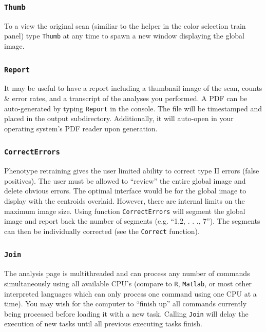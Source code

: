 \documentclass[12pt]{article}
\begin{document}
\subsubsection{\tt Thumb}

To a view the original scan (similiar to the helper in the color {\sf selection train} panel) type {\tt Thumb} at any time to spawn a new window displaying the global image.

\subsubsection{\tt Report}

It may be useful to have a report including a thumbnail image of the scan, counts \& error rates, and a transcript of the analyses you performed. A PDF can be auto-generated by typing {\tt Report} in the console. The file will be timestamped and placed in the output subdirectory. Additionally, it will auto-open in your operating system's PDF reader upon generation.

\subsubsection{\tt CorrectErrors}

Phenotype retraining gives the user limited ability to correct type II errors (false positives). The user must be allowed to ``review'' the entire global image and delete obvious errors. The optimal interface would be for the global image to display with the centroids overlaid. However, there are internal limits on the maximum image size. Using function {\tt CorrectErrors} will segment the global image and report back the number of segments (e.g. ``1,2, . . ., 7''). The segments can then be individually corrected (see the {\tt Correct} function).

\subsubsection{\tt Join}

The analysis page is multithreaded and can process any number of commands simultaneously using all available CPU's (compare to {\tt R}, {\tt Matlab}, or most other interpreted languages which can only process one command using one CPU at a time). You may wish for the computer to ``finish up'' all commands currently being processed before loading it with a new task. Calling {\tt Join} will delay the execution of new tasks until all previous executing tasks finish.
\end{document}
